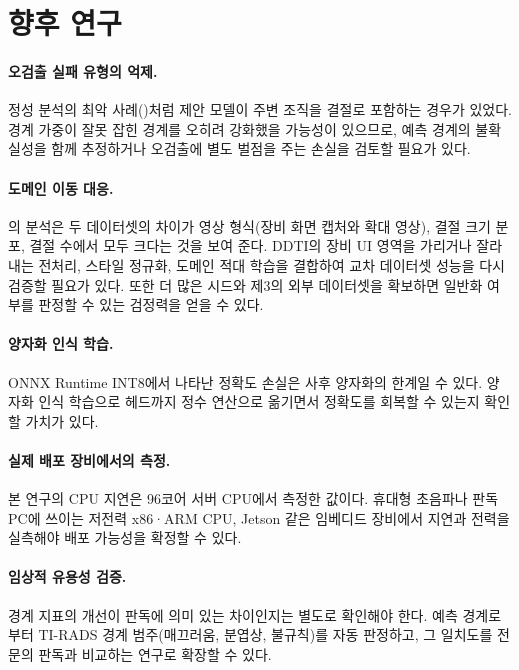 \section{향후 연구}

\paragraph{오검출 실패 유형의 억제.} 정성 분석의 최악 사례()처럼 제안 모델이
주변 조직을 결절로 포함하는 경우가 있었다. 경계 가중이 잘못 잡힌 경계를 오히려 강화했을 가능성이 있으므로,
예측 경계의 불확실성을 함께 추정하거나 오검출에 별도 벌점을 주는 손실을 검토할 필요가 있다.

\paragraph{도메인 이동 대응.} 의 분석은 두 데이터셋의 차이가 영상 형식(장비 화면
캡처와 확대 영상), 결절 크기 분포, 결절 수에서 모두 크다는 것을 보여 준다. DDTI의 장비 UI 영역을
가리거나 잘라내는 전처리, 스타일 정규화, 도메인 적대 학습\citep{ganin2015dann}을 결합하여 교차 데이터셋
성능을 다시 검증할 필요가 있다. 또한 더 많은 시드와 제3의 외부 데이터셋을 확보하면 일반화 여부를
판정할 수 있는 검정력을 얻을 수 있다.

\paragraph{양자화 인식 학습.} ONNX Runtime INT8에서 나타난 정확도 손실은 사후 양자화의 한계일 수 있다.
양자화 인식 학습으로 헤드까지 정수 연산으로 옮기면서 정확도를 회복할 수 있는지 확인할 가치가 있다.

\paragraph{실제 배포 장비에서의 측정.} 본 연구의 CPU 지연은 96코어 서버 CPU에서 측정한 값이다.
휴대형 초음파나 판독 PC에 쓰이는 저전력 x86·ARM CPU, Jetson 같은 임베디드 장비에서 지연과 전력을
실측해야 배포 가능성을 확정할 수 있다.

\paragraph{임상적 유용성 검증.} 경계 지표의 개선이 판독에 의미 있는 차이인지는 별도로 확인해야 한다.
예측 경계로부터 TI-RADS 경계 범주(매끄러움, 분엽상, 불규칙)를 자동 판정하고, 그 일치도를 전문의 판독과
비교하는 연구로 확장할 수 있다.
